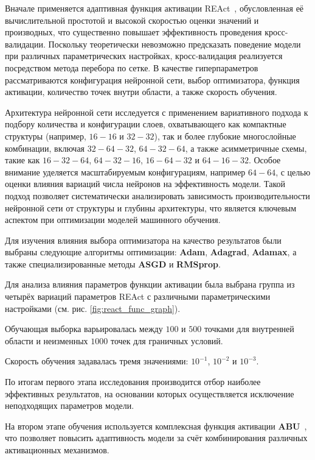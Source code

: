 Вначале применяется адаптивная функция активации
REAct~\cite{0d752c79fb816703274a3d37f85a85689a2a9405}, обусловленная её вычислительной
простотой и высокой скоростью оценки значений и производных, что существенно
повышает эффективность проведения кросс-валидации. Поскольку теоретически
невозможно предсказать поведение модели при различных параметрических настройках,
кросс-валидация реализуется посредством метода перебора по сетке. В качестве
гиперпараметров рассматриваются конфигурация нейронной сети, выбор оптимизатора,
функция активации, количество точек внутри области, а также скорость обучения.


Архитектура нейронной сети исследуется с применением вариативного подхода к
подбору количества и конфигурации слоев, охватывающего как компактные структуры
(например, $16-16$ и $32-32$), так и более глубокие многослойные комбинации,
включая $32-64-32$, $64-32-64$, а также асимметричные схемы, такие как
$16-32-64$, $64-32-16$, $16-64-32$ и $64-16-32$. Особое внимание уделяется
масштабируемым конфигурациям, например $64-64$, с целью оценки влияния
вариаций числа нейронов на эффективность модели. Такой подход позволяет
систематически анализировать зависимость производительности нейронной сети
от структуры и глубины архитектуры, что является ключевым аспектом при
оптимизации моделей машинного обучения.



Для изучения влияния выбора оптимизатора на качество результатов были выбраны
следующие алгоритмы оптимизации: \textbf{Adam}, \textbf{Adagrad}, \textbf{Adamax},
а также специализированные методы \textbf{ASGD} и \textbf{RMSprop}.

Для анализа влияния параметров функции активации была выбрана группа из четырёх вариаций параметров
REAct с различными параметрическими настройками (см. рис. \ref{fig:react_func_graph}).

Обучающая выборка варьировалась между $100$ и $500$ точками для внутренней
области и неизменных $1000$ точек для граничных условий. 

Скорость обучения задавалась тремя значениями: $10^{-1}$, $10^{-2}$ и $10^{-3}$.

По итогам первого этапа исследования производится отбор наиболее эффективных результатов,
на основании которых осуществляется исключение неподходящих параметров модели.



На втором этапе обучения используется комплексная функция активации
\textbf{ABU}~\cite{Sutfeld2018-io}, что позволяет повысить адаптивность модели за счёт
комбинирования различных активационных механизмов.

